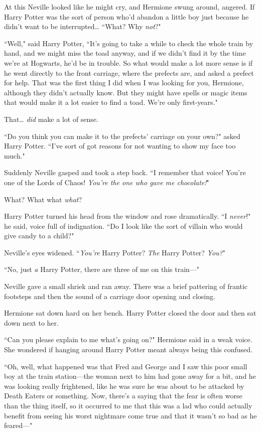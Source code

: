 At this Neville looked like he might cry, and Hermione swung around, angered. If Harry Potter was the sort of person who'd abandon a little boy just because he didn't want to be interrupted{\ldots} ``What? Why \emph{not}?"

``Well," said Harry Potter, ``It's going to take a while to check the whole train by hand, and we might miss the toad anyway, and if we didn't find it by the time we're at Hogwarts, he'd be in trouble. So what would make a lot more sense is if he went directly to the front carriage, where the prefects are, and asked a prefect for help. That was the first thing I did when I was looking for you, Hermione, although they didn't actually know. But they might have spells or magic items that would make it a lot easier to find a toad. We're only first-years."

That{\ldots} \emph{did} make a lot of sense.

``Do you think you can make it to the prefects' carriage on your own?" asked Harry Potter. ``I've sort of got reasons for not wanting to show my face too much."

Suddenly Neville gasped and took a step back. ``I remember that voice! You're one of the Lords of Chaos! \emph{You're the one who gave me chocolate!}"

What? What what \emph{what}?

Harry Potter turned his head from the window and rose dramatically. ``I \emph{never}!" he said, voice full of indignation. ``Do I look like the sort of villain who would give candy to a child?"

Neville's eyes widened. ``\emph{You're} Harry Potter? \emph{The} Harry Potter? \emph{You?}"

``No, just \emph{a} Harry Potter, there are three of me on this train---"

Neville gave a small shriek and ran away. There was a brief pattering of frantic footsteps and then the sound of a carriage door opening and closing.

Hermione sat down hard on her bench. Harry Potter closed the door and then sat down next to her.

``Can you please explain to me what's going on?" Hermione said in a weak voice. She wondered if hanging around Harry Potter meant always being this confused.

``Oh, well, what happened was that Fred and George and I saw this poor small boy at the train station---the woman next to him had gone away for a bit, and he was looking really frightened, like he was sure he was about to be attacked by Death Eaters or something. Now, there's a saying that the fear is often worse than the thing itself, so it occurred to me that this was a lad who could actually benefit from seeing his worst nightmare come true and that it wasn't so bad as he feared---"

